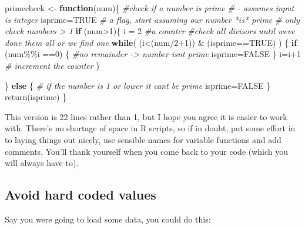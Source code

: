 \documentclass[
]{book}
\newenvironment{Shaded}{\begin{snugshade}}{\end{snugshade}}
\newcommand{\CommentTok}[1]{\textcolor[rgb]{0.56,0.35,0.01}{\textit{#1}}}
\newcommand{\ConstantTok}[1]{\textcolor[rgb]{0.00,0.00,0.00}{#1}}
\newcommand{\ControlFlowTok}[1]{\textcolor[rgb]{0.13,0.29,0.53}{\textbf{#1}}}
\newcommand{\DecValTok}[1]{\textcolor[rgb]{0.00,0.00,0.81}{#1}}
\newcommand{\FunctionTok}[1]{\textcolor[rgb]{0.00,0.00,0.00}{#1}}
\newcommand{\NormalTok}[1]{#1}
\newcommand{\OtherTok}[1]{\textcolor[rgb]{0.56,0.35,0.01}{#1}}
\newcommand{\SpecialCharTok}[1]{\textcolor[rgb]{0.00,0.00,0.00}{#1}}
\begin{document}
\begin{Shaded}
\begin{Highlighting}[]
\NormalTok{primecheck }\OtherTok{\textless{}{-}} \ControlFlowTok{function}\NormalTok{(num)\{}
  \CommentTok{\#check if a number is prime}
  \CommentTok{\# {-} assumes input is integer}
\NormalTok{  isprime}\OtherTok{=}\ConstantTok{TRUE} \CommentTok{\# a flag, start assuming our number *is* prime }
  \CommentTok{\# only check numbers \textgreater{} 1}
  \ControlFlowTok{if}\NormalTok{ (num}\SpecialCharTok{\textgreater{}}\DecValTok{1}\NormalTok{)\{ }
\NormalTok{    i }\OtherTok{=} \DecValTok{2} \CommentTok{\#a counter}
      \CommentTok{\#check all divisors until we\textquotesingle{}ve done them all or we find one }
\ControlFlowTok{while}\NormalTok{( (i}\SpecialCharTok{\textless{}}\NormalTok{(num}\SpecialCharTok{/}\DecValTok{2}\SpecialCharTok{+}\DecValTok{1}\NormalTok{)) }\SpecialCharTok{\&}\NormalTok{ (isprime}\SpecialCharTok{==}\ConstantTok{TRUE}\NormalTok{) ) \{}
  \ControlFlowTok{if}\NormalTok{ (num}\SpecialCharTok{\%\%}\NormalTok{i }\SpecialCharTok{==}\DecValTok{0}\NormalTok{) \{}
    \CommentTok{\#no remainder {-}\textgreater{} number isn\textquotesingle{}t prime}
\NormalTok{    isprime}\OtherTok{=}\ConstantTok{FALSE}
\NormalTok{  \}}
\NormalTok{  i}\OtherTok{=}\NormalTok{i}\SpecialCharTok{+}\DecValTok{1} \CommentTok{\# increment the counter}
\NormalTok{\}}

\NormalTok{\} }\ControlFlowTok{else}\NormalTok{ \{}
  \CommentTok{\# if the number is 1 or lower it can\textquotesingle{}t be prime}
\NormalTok{  isprime}\OtherTok{=}\ConstantTok{FALSE}
\NormalTok{\}}
\FunctionTok{return}\NormalTok{(isprime)}
\NormalTok{\}}
\end{Highlighting}
\end{Shaded}

This version is 22 lines rather than 1, but I hope you agree it is easier to work with. There's no shortage of space in R scripts, so if in doubt, put some effort in to laying things out nicely, use sensible names for variable functions and add comments. You'll thank yourself when you come back to your code (which you will always have to).

\hypertarget{avoid-hard-coded-values}{%
\subsection{Avoid hard coded values}\label{avoid-hard-coded-values}}

Say you were going to load some data, you could do this:
\end{document}
